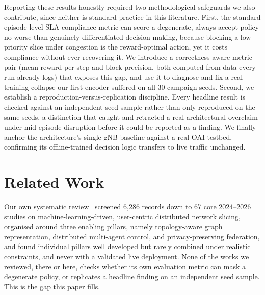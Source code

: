\documentclass[pdflatex,sn-basic,Numbered]{sn-jnl}%
\begin{document}
Reporting these results honestly required two methodological
safeguards we also contribute, since neither is standard practice in
this literature. First, the standard episode-level SLA-compliance metric can score a degenerate, always-accept policy no worse than genuinely differentiated decision-making, because blocking a low-priority slice under congestion is the reward-optimal action, yet it costs compliance without ever recovering it. We introduce a correctness-aware metric pair (mean reward per step and block precision, both computed from data every run already logs) that exposes this gap, and use it to diagnose and fix a real training collapse our first encoder suffered on all 30 campaign seeds. Second, we establish a reproduction-versus-replication discipline. Every headline result is checked against an independent seed sample rather than only reproduced on the same seeds, a distinction that caught and retracted a real architectural overclaim under mid-episode disruption before it could be reported as a finding. We finally anchor the architecture's
single-gNB baseline against a real OAI testbed, confirming its
offline-trained decision logic transfers to live traffic unchanged.

\section{Related Work}
\label{sec:litreview}
Our own systematic review~\cite{ref:access} screened 6{,}286 records down to 67 core 2024--2026 studies on machine-learning-driven, user-centric distributed network slicing, organised around three enabling pillars, namely topology-aware graph representation, distributed multi-agent control, and privacy-preserving federation, and found individual pillars well developed but rarely combined under realistic constraints, and never with a validated live deployment. None of the works we reviewed, there or here, checks whether its own evaluation metric can mask a degenerate policy, or replicates a headline finding on an independent seed sample. This is the gap this paper fills.
\end{document}
